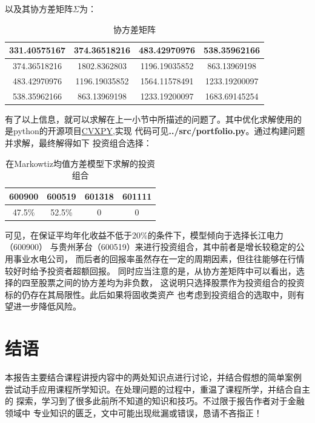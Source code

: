 \documentclass[UTF8]{ctexart}
\numberwithin{figure}{section}
\numberwithin{table}{section}
\numberwithin{equation}{section}
\begin{document}
    以及其协方差矩阵$\Sigma$为：
   
    \begin{table}[H]
        \centering
        \begin{tabular}{|c|c|c|c|}
        \hline
        331.40575167 & 374.36518216  & 483.42970976  & 538.35962166  \\ \hline
        374.36518216 & 1802.8362803  & 1196.19035852 & 863.13969198  \\ \hline
        483.42970976 & 1196.19035852 & 1564.11578491 & 1233.19200097 \\ \hline
        538.35962166 & 863.13969198  & 1233.19200097 & 1683.69145254 \\ \hline
        \end{tabular}
        \caption{协方差矩阵}
    \end{table}

        有了以上信息，就可以求解在上一小节中所描述的问题了。其中优化求解使用的
    是python的开源项目\href{https://www.cvxpy.org/index.html}{CVXPY},实现
    代码可见\textbf{../src/portfolio.py}。通过构建问题并求解，最终解得如下
    投资组合选择：

    \begin{table}[H]
        \centering
        \begin{tabular}{|c|c|c|c|}
        \hline
        600900 & 600519 & 601318 & 601111 \\ \hline
        47.5\% & 52.5\% & 0      & 0      \\ \hline
        \end{tabular}
        \caption{在Markowtiz均值方差模型下求解的投资组合}
    \end{table}

        可见，在保证平均年化收益不低于20\%的条件下，模型倾向于选择长江电力（600900）
    与贵州茅台（600519）来进行投资组合，其中前者是增长较稳定的公用事业水电公司，
    而后者的回报率虽然存在一定的周期因素，但往往能够在行情较好时给予投资者超额回报。
    同时应当注意的是，从协方差矩阵中可以看出，选择的四至股票之间的协方差均为非负数，
    这说明只选择股票作为投资组合的投资标的仍存在其局限性。此后如果将固收类资产
    也考虑到投资组合的选取中，则有望进一步降低风险。

    \section{结语}
        本报告主要结合课程讲授内容中的两处知识点进行讨论，并结合假想的简单案例
    尝试动手应用课程所学知识。在处理问题的过程中，重温了课程所学，并结合自主的
    探索，学习到了很多此前所不知道的知识和技巧。不过限于报告作者对于金融领域中
    专业知识的匮乏，文中可能出现纰漏或错误，恳请不吝指正！
\end{document}
